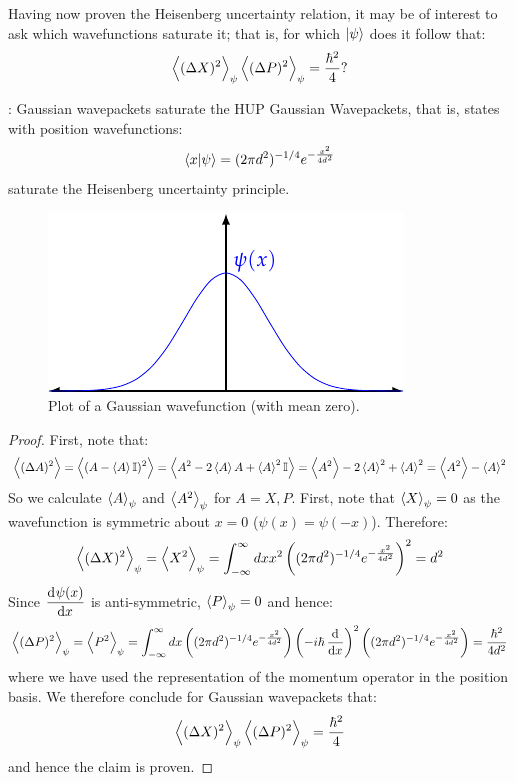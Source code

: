 Having now proven the Heisenberg uncertainty relation, it may be of interest to ask which wavefunctions saturate it; that is, for which $\lvert \psi \rangle$ does it follow that:
\begin{equation}
    \left< (\Delta X)^2 \right>_\psi\left< (\Delta P)^2 \right>_\psi = \frac{\hbar^2}{4}?
\end{equation} 

\begin{propbox}{: Gaussian wavepackets saturate the HUP}
    Gaussian Wavepackets, that is, states with position wavefunctions:
    \begin{equation}
        \langle x \lvert \psi \rangle = (2\pi d^2)^{-1/4}e^{-\frac{x^2}{4d^2}}
    \end{equation}
    saturate the Heisenberg uncertainty principle.
\end{propbox}

\begin{figure}[htbp]
    \centering
    \includegraphics[]{Images/fig-Gaussian.pdf}
    \caption{Plot of a Gaussian wavefunction (with mean zero).}
    \label{fig-Gaussian}
\end{figure}
\begin{proof}
    First, note that:
    \begin{equation}
        \left< (\Delta A)^2 \right> = \left< (A - \left< A \right>\mathbb{I})^2 \right> = \left< A^2 - 2\left< A \right>A + \left< A \right>^2\mathbb{I} \right> = \left< A^2 \right> - 2\left< A \right>^2 + \left< A \right>^2 = \left< A^2 \right> - \left< A \right>^2
    \end{equation}
    So we calculate $\left< A \right>_\psi$ and $\left< A^2 \right>_\psi$ for $A = X, P$. First, note that $\left< X \right>_\psi = 0$ as the wavefunction is symmetric about $x = 0$ ($\psi(x) = \psi(-x)$). Therefore:
    \begin{equation}
        \left< (\Delta X)^2 \right>_\psi = \left< X^2 \right>_\psi = \int_{-\infty}^\infty dx x^2\left((2\pi d^2)^{-1/4}e^{-\frac{x^2}{4d^2}}\right)^2 = d^2
    \end{equation}
    Since $\dod{\psi(x)}{x}$ is anti-symmetric, $\left< P \right>_\psi = 0$ and hence:
    \begin{equation}
        \avg{(\Delta P)^2}_\psi = \avg{P^2}_\psi = \int_{-\infty}^\infty dx\left((2\pi d^2)^{-1/4}e^{-\frac{x^2}{4d^2}}\right)\left(-i\hbar\dod{}{x}\right)^2\left((2\pi d^2)^{-1/4}e^{-\frac{x^2}{4d^2}}\right) = \frac{\hbar^2}{4d^2}
    \end{equation}
    where we have used the representation of the momentum operator in the position basis. We therefore conclude for Gaussian wavepackets that:
    \begin{equation}
        \left< (\Delta X)^2 \right>_\psi \left< (\Delta P)^2 \right>_\psi = \frac{\hbar^2}{4}
    \end{equation}
    and hence the claim is proven.
\end{proof}

